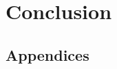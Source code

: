 \documentclass{l4proj}
\begin{document}
\chapter{Conclusion}

%
%

\begin{appendices}

\chapter{Appendices}

\end{appendices}






\end{document}

